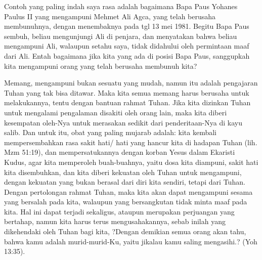 \documentclass[11pt,a5paper]{article}
\begin{document}
Contoh yang paling indah saya rasa adalah bagaimana Bapa Paus Yohanes Paulus II yang mengampuni Mehmet Ali Agca, yang telah berusaha membunuhnya, dengan menembaknya pada tgl 13 mei 1981. Begitu Bapa Paus sembuh, beliau mengunjungi Ali di penjara, dan menyatakan bahwa beliau mengampuni Ali, walaupun setahu saya, tidak didahului oleh permintaan maaf dari Ali. Entah bagaimana jika kita yang ada di posisi Bapa Paus, sanggupkah kita mengampuni orang yang telah berusaha membunuh kita?

Memang, mengampuni bukan sesuatu yang mudah, namun itu adalah pengajaran Tuhan yang tak bisa ditawar. Maka kita semua memang harus berusaha untuk melakukannya, tentu dengan bantuan rahmat Tuhan. Jika kita dizinkan Tuhan untuk mengalami pengalaman disakiti oleh orang lain, maka kita diberi kesempatan oleh-Nya untuk merasakan sedikit dari penderitaan-Nya di kayu salib. Dan untuk itu, obat yang paling mujarab adalah: kita kembali mempersembahkan rasa sakit hati/ hati yang hancur kita di hadapan Tuhan (lih. Mzm 51:19), dan mempersatukannya dengan korban Yesus dalam Ekaristi Kudus, agar kita memperoleh buah-buahnya, yaitu dosa kita diampuni, sakit hati kita disembuhkan, dan kita diberi kekuatan oleh Tuhan untuk mengampuni, dengan kekuatan yang bukan berasal dari diri kita sendiri, tetapi dari Tuhan. Dengan pertolongan rahmat Tuhan, maka kita akan dapat mengampuni sesama yang bersalah pada kita, walaupun yang bersangkutan tidak minta maaf pada kita. Hal ini dapat terjadi sekaligus, ataupun merupakan perjuangan yang bertahap, namun kita harus terus mengusahakannya, sebab inilah yang dikehendaki oleh Tuhan bagi kita, ?Dengan demikian semua orang akan tahu, bahwa kamu adalah murid-murid-Ku, yaitu jikalau kamu saling mengasihi.? (Yoh 13:35).
\end{document}
